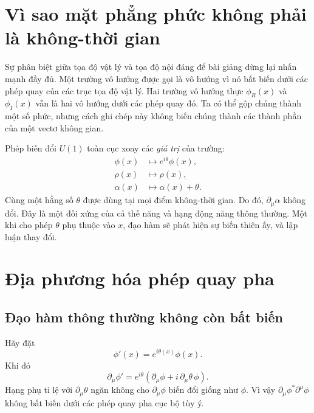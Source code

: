 \section{Vì sao mặt phẳng phức không phải là không-thời gian}

Sự phân biệt giữa tọa độ vật lý và tọa độ nội đáng để bài giảng dừng lại nhấn mạnh đầy đủ. Một trường vô hướng được gọi là vô hướng vì nó bất biến dưới các phép quay của các trục tọa độ vật lý. Hai trường vô hướng thực \(\phi_R(x)\) và \(\phi_I(x)\) vẫn là hai vô hướng dưới các phép quay đó. Ta có thể gộp chúng thành một số phức, nhưng cách ghi chép này không biến chúng thành các thành phần của một vectơ không gian.

Phép biến đổi \(U(1)\) toàn cục xoay các \emph{giá trị} của trường:
\begin{equation}
\begin{aligned}
  \phi(x)&\longmapsto e^{i\theta}\phi(x),
  \\
  \rho(x)&\longmapsto\rho(x),
  \\
  \alpha(x)&\longmapsto\alpha(x)+\theta.
\end{aligned}
  \label{eq:l08-global-shift}
\end{equation}
Cùng một hằng số \(\theta\) được dùng tại mọi điểm không-thời gian. Do đó,
\(\partial_\mu\alpha\) không đổi. Đây là một đối xứng của cả thế năng
và hạng động năng thông thường. Một khi cho phép \(\theta\) phụ thuộc vào
\(x\), đạo hàm sẽ phát hiện sự biến thiên ấy, và lập luận thay đổi.

\section{Địa phương hóa phép quay pha}

\subsection{Đạo hàm thông thường không còn bất biến}

Hãy đặt
\begin{equation}
  \phi'(x)=e^{i\theta(x)}\phi(x).
  \label{eq:l08-local-phase}
\end{equation}
Khi đó
\begin{equation}
  \partial_\mu\phi'
  =e^{i\theta}
    \left(\partial_\mu\phi+i\,\partial_\mu\theta\,\phi\right).
  \label{eq:l08-ordinary-derivative-fails}
\end{equation}
Hạng phụ tỉ lệ với \(\partial_\mu\theta\) ngăn không cho
\(\partial_\mu\phi\) biến đổi giống như \(\phi\). Vì vậy
\(\partial_\mu\phi^*\partial^\mu\phi\) không bất biến dưới các phép quay
pha cục bộ tùy ý.

